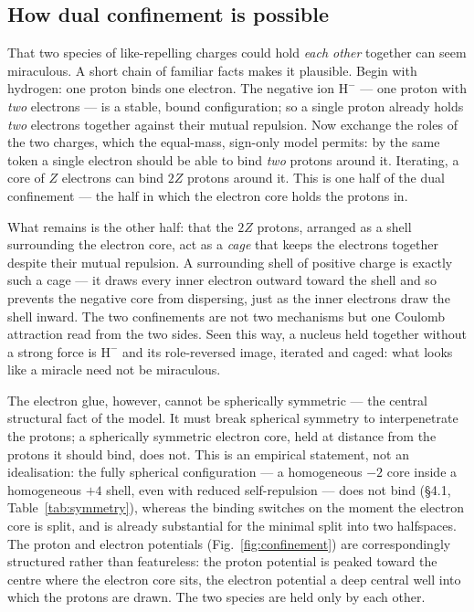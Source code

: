 \documentclass[11pt]{article}
\begin{document}
\subsection{How dual confinement is possible}

That two species of like-repelling charges could hold \emph{each other} together can seem
miraculous. A short chain of familiar facts makes it plausible. Begin with hydrogen: one proton
binds one electron. The negative ion $\mathrm{H}^-$ --- one proton with \emph{two} electrons ---
is a stable, bound configuration; so a single proton already holds \emph{two} electrons together
against their mutual repulsion. Now exchange the roles of the two charges, which the equal-mass,
sign-only model permits: by the same token a single electron should be able to bind \emph{two}
protons around it. Iterating, a core of $Z$ electrons can bind $2Z$ protons around it. This is one
half of the dual confinement --- the half in which the electron core holds the protons in.

What remains is the other half: that the $2Z$ protons, arranged as a shell surrounding the
electron core, act as a \emph{cage} that keeps the electrons together despite their mutual
repulsion. A surrounding shell of positive charge is exactly such a cage --- it draws every inner
electron outward toward the shell and so prevents the negative core from dispersing, just as the
inner electrons draw the shell inward. The two confinements are not two mechanisms but one Coulomb
attraction read from the two sides. Seen this way, a nucleus held together without a strong force
is $\mathrm{H}^-$ and its role-reversed image, iterated and caged: what looks like a miracle need
not be miraculous.

The electron glue, however, cannot be spherically symmetric --- the central structural fact of
the model. It must break spherical symmetry to interpenetrate the protons; a spherically
symmetric electron core, held at distance from the protons it should bind, does not. This is an
empirical statement, not an idealisation: the fully spherical configuration --- a homogeneous
$-2$ core inside a homogeneous $+4$ shell, even with reduced self-repulsion --- does not bind
(\S4.1, Table~\ref{tab:symmetry}), whereas the binding switches on the moment the electron core
is split, and is already substantial for the minimal split into two halfspaces. The proton and
electron potentials (Fig.~\ref{fig:confinement}) are correspondingly structured rather than
featureless: the proton potential is peaked toward the centre where the electron core sits, the
electron potential a deep central well into which the protons are drawn. The two species are held
only by each other.
\end{document}
